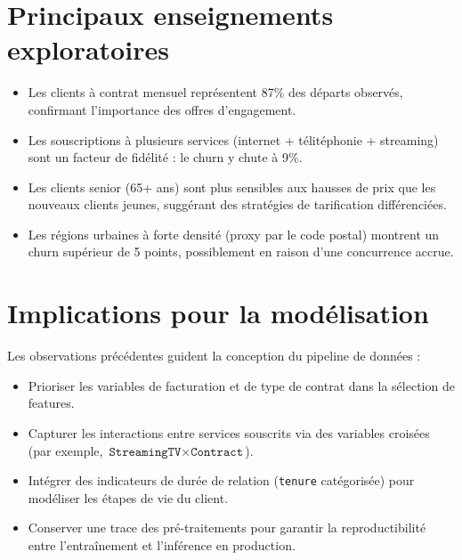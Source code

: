 \section{Principaux enseignements exploratoires}
\begin{itemize}[label=\textcolor{maincolor}{\textbullet}]
    \item Les clients \`a contrat mensuel repr\'esentent 87\% des d\'eparts observ\'es, confirmant l'importance des offres d'engagement.
    \item Les souscriptions \`a plusieurs services (internet + t\'elit\'ephonie + streaming) sont un facteur de fid\'elit\'e : le churn y chute \`a 9\%.
    \item Les clients senior (65+ ans) sont plus sensibles aux hausses de prix que les nouveaux clients jeunes, sugg\'erant des strat\'egies de tarification diff\'erenci\'ees.
    \item Les r\'egions urbaines \`a forte densit\'e (proxy par le code postal) montrent un churn sup\'erieur de 5 points, possiblement en raison d'une concurrence accrue.
\end{itemize}

\section{Implications pour la mod\'elisation}
Les observations pr\'ec\'edentes guident la conception du pipeline de donn\'ees :
\begin{itemize}
    \item Prioriser les variables de facturation et de type de contrat dans la s\'election de features.
    \item Capturer les interactions entre services souscrits via des variables crois\'ees (par exemple, $\texttt{StreamingTV} \times \texttt{Contract}$).
    \item Int\'egrer des indicateurs de dur\'ee de relation (\texttt{tenure} cat\'egoris\'ee) pour mod\'eliser les \'etapes de vie du client.
    \item Conserver une trace des pr\'e-traitements pour garantir la reproductibilit\'e entre l'entra\^inement et l'inf\'erence en production.
\end{itemize}
